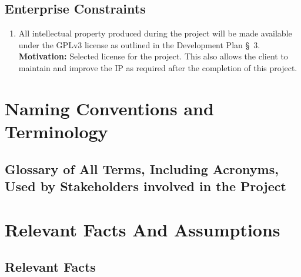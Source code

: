 \documentclass[12pt]{article}
\begin{document}
\subsection{Enterprise Constraints}
\begin{enumerate}[align=left,
  leftmargin=*,
  labelsep=1em,
  itemindent=0em,
  label=\bfseries EPC-\arabic*:]
  \item All intellectual property produced during the project will be made available under the GPLv3 license as
    outlined in the Development Plan \S \ 3.\\[2mm]
    {\bf Motivation:} Selected license for the project. This also allows the client to maintain and improve the
    IP as required after the completion of this project.
\end{enumerate}

\section{Naming Conventions and Terminology}
\subsection{Glossary of All Terms, Including Acronyms, Used by Stakeholders
involved in the Project}
\glsaddall
\printnoidxglossaries

\section{Relevant Facts And Assumptions}

\subsection{Relevant Facts}
\end{document}
